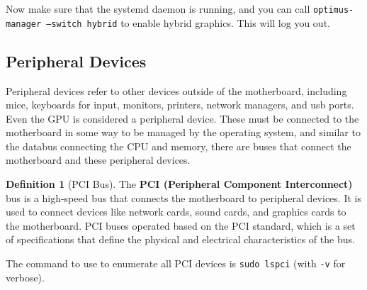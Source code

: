 \documentclass{article}
\theoremstyle{definition}
\newtheorem{definition}{Definition}[section]
\begin{document}
      Now make sure that the systemd daemon is running, and you can call \texttt{optimus-manager --switch hybrid} to enable hybrid graphics. This will log you out. 

    \subsection{Peripheral Devices} 
      
      Peripheral devices refer to other devices outside of the motherboard, including mice, keyboards for input, monitors, printers, network managers, and usb ports. Even the GPU is considered a peripheral device. These must be connected to the motherboard in some way to be managed by the operating system, and similar to the databus connecting the CPU and memory, there are buses that connect the motherboard and these peripheral devices. 

      \begin{definition}[PCI Bus]
        The \textbf{PCI (Peripheral Component Interconnect)} bus is a high-speed bus that connects the motherboard to peripheral devices. It is used to connect devices like network cards, sound cards, and graphics cards to the motherboard. PCI buses operated based on the PCI standard, which is a set of specifications that define the physical and electrical characteristics of the bus. 
      \end{definition}

      The command to use to enumerate all PCI devices is \texttt{sudo lspci} (with \texttt{-v} for verbose). 
      
\end{document}

